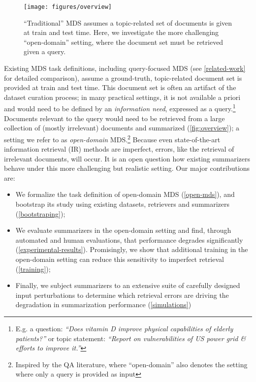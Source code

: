 \documentclass[11pt]{article}
\begin{document}
\begin{figure}[t]
\texttt{[image: figures/overview]}
\caption{``Traditional'' MDS assumes a topic-related set of documents is given at train and test time. Here, we investigate the more challenging ``open-domain'' setting, where the document set must be retrieved given a query.
}
\label{fig:overview}
\vspace{-5mm}
\end{figure}



Existing MDS task definitions, including query-focused MDS (see \textsection \ref{related-work} for detailed comparison), assume a ground-truth, topic-related document set is provided at train and test time. This document set is often an artifact of the dataset curation process; in many practical settings, it is not available a priori and would need to be defined by an \textit{information need}, expressed as a query.\footnote{E.g. a question: \textit{``Does vitamin D improve physical capabilities of elderly patients?''} or topic statement: \textit{``Report on vulnerabilities of US power grid \& efforts to improve it.''}} Documents relevant to the query would need to be retrieved from a large collection of (mostly irrelevant) documents and summarized (\autoref{fig:overview}); a setting we refer to as \textit{open-domain} MDS.\footnote{Inspired by the QA literature, where ``open-domain'' also denotes the setting where only a query is provided as input} Because even state-of-the-art information retrieval (IR) methods are imperfect, errors, like the retrieval of irrelevant documents, will occur. It is an open question how existing summarizers behave under this more challenging but realistic setting. Our major contributions are:

\begin{itemize}[itemsep=0.2pt, topsep=3pt, leftmargin=10pt]
    \item We formalize the task definition of open-domain MDS (\textsection \ref{open-mds}), and bootstrap its study using existing datasets, retrievers and summarizers (\textsection \ref{bootstraping});
    \item We evaluate summarizers in the open-domain setting and find, through automated and human evaluations, that performance degrades significantly (\textsection \ref{experimental-results}). Promisingly, we show that additional training in the open-domain setting can reduce this sensitivity to imperfect retrieval (\textsection \ref{training});
    \item Finally, we subject summarizers to an extensive suite of carefully designed input perturbations to determine which retrieval errors are driving the degradation in summarization performance (\textsection \ref{simulations})
\end{itemize}
\end{document}
